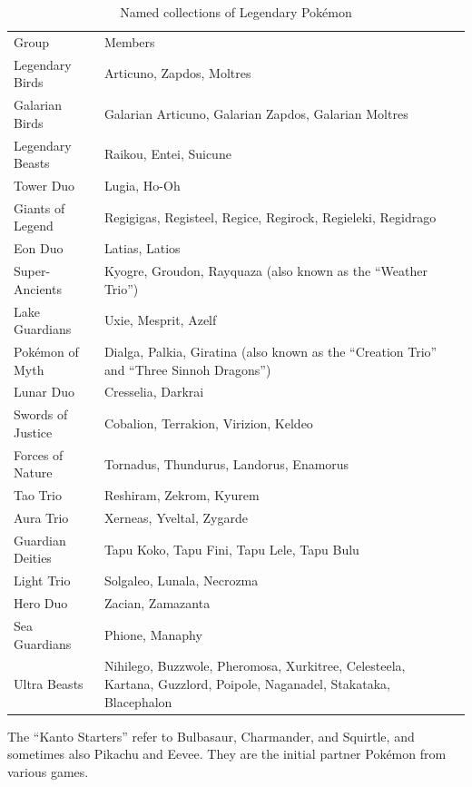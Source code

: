 \begin{table}
\begin{tabular}{lp{}}
Group & Members\\
\Midrule
Legendary Birds & Articuno, Zapdos, Moltres\\
Galarian Birds & Galarian Articuno, Galarian Zapdos, Galarian Moltres\\
Legendary Beasts & Raikou, Entei, Suicune\\
Tower Duo & Lugia, Ho-Oh\\
Giants of Legend & Regigigas, Registeel, Regice, Regirock, Regieleki, Regidrago\\
Eon Duo & Latias, Latios\\
Super-Ancients & Kyogre, Groudon, Rayquaza (also known as the ``Weather Trio'')\\
Lake Guardians & Uxie, Mesprit, Azelf\\
Pokémon of Myth & Dialga, Palkia, Giratina (also known as the ``Creation Trio'' and ``Three Sinnoh Dragons'')\\
Lunar Duo & Cresselia, Darkrai\\
Swords of Justice & Cobalion, Terrakion, Virizion, Keldeo\\
Forces of Nature & Tornadus, Thundurus, Landorus, Enamorus\\
Tao Trio & Reshiram, Zekrom, Kyurem\\
Aura Trio & Xerneas, Yveltal, Zygarde\\
Guardian Deities & Tapu Koko, Tapu Fini, Tapu Lele, Tapu Bulu\\
Light Trio & Solgaleo, Lunala, Necrozma\\
Hero Duo & Zacian, Zamazanta\\
Sea Guardians & Phione, Manaphy\\
Ultra Beasts & Nihilego, Buzzwole, Pheromosa, Xurkitree, Celesteela, Kartana, Guzzlord,
               Poipole, Naganadel, Stakataka, Blacephalon \\
\end{tabular}
\caption{Named collections of Legendary Pokémon\label{table:namedmyths}}
\end{table}

\begin{tipbox}[title=Kanto Starters]
The ``Kanto Starters'' refer to Bulbasaur, Charmander, and Squirtle, and sometimes
  also Pikachu and Eevee.
They are the initial partner Pokémon from various games.
\end{tipbox}

